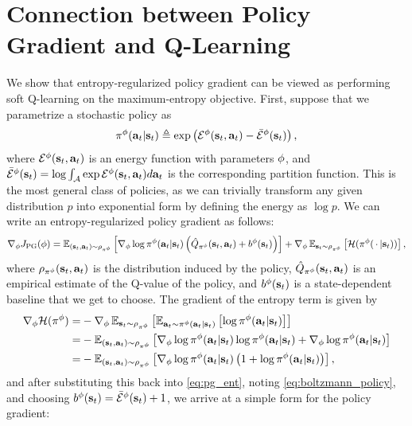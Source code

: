 \section{Connection between Policy Gradient and Q-Learning}
\label{app:pg}
We show that entropy-regularized policy gradient can be viewed as performing soft Q-learning on the maximum-entropy objective. First, suppose that we parametrize a stochastic policy as
\begin{align}
\pi^\phi({\mathbf{a}_t}|{\mathbf{s}_t}) \triangleq \exp\left(\mathcal{E}^\phi({\mathbf{s}_t}, {\mathbf{a}_t}) - \bar{\mathcal{E}}^\phi({\mathbf{s}_t})\right),
\label{eq:boltzmann_policy}
\end{align}
where $\mathcal{E}^\phi({\mathbf{s}_t}, {\mathbf{a}_t})$ is an energy function with parameters $\phi$, and $\bar{\mathcal{E}}^\phi({\mathbf{s}_t}) =\log\int_{\mathcal{A}} \exp\mathcal{E}^\phi({\mathbf{s}_t}, {\mathbf{a}_t})d{\mathbf{a}_t}$ is the corresponding partition function. This is the most general class of policies, as we can trivially transform any given distribution $p$ into exponential form by defining the energy as $\log p$. We can write an entropy-regularized policy gradient as follows:
\begin{align}
\nabla_\phi J_\mathrm{PG}(\phi) =  \operatorname{\mathbb{E}}_{({\mathbf{s}_t}, {\mathbf{a}_t})\sim\rho_{\pi^\phi}}\left[\nabla_\phi\log\pi^\phi({\mathbf{a}_t}|{\mathbf{s}_t})\left(\hat{Q}_{\pi^\phi}({\mathbf{s}_t}, {\mathbf{a}_t})+ b^\phi({\mathbf{s}_t})\right)\right]   + \nabla_\phi\operatorname{\mathbb{E}}_{{\mathbf{s}_t}\sim\rho_{\pi^\phi}}\left[\mathcal{H}(\pi^\phi(\,\cdot\, | {\mathbf{s}_t}))\right],
\label{eq:pg_ent}
\end{align}
where $\rho_{\pi^\phi}({\mathbf{s}_t}, {\mathbf{a}_t})$ is the distribution induced by the policy, $\hat{Q}_{\pi^\phi}({\mathbf{s}_t}, {\mathbf{a}_t})$ is an empirical estimate of the Q-value of the policy, and $b^\phi({\mathbf{s}_t})$ is a state-dependent baseline that we get to choose. The gradient of the entropy term is given by
\begin{align}
\nabla_\phi \mathcal{H}(\pi^\phi) = &-\nabla_\phi\operatorname{\mathbb{E}}_{{\mathbf{s}_t}\sim\rho_{\pi^\phi}}\left[\operatorname{\mathbb{E}}_{{\mathbf{a}_t}\sim\pi^\phi({\mathbf{a}_t}|{\mathbf{s}_t})}\left[\log\pi^\phi({\mathbf{a}_t}|{\mathbf{s}_t})\right]\right]\notag\\
=&-\operatorname{\mathbb{E}}_{({\mathbf{s}_t}, {\mathbf{a}_t})\sim\rho_{\pi^\phi}}\left[\nabla_\phi\log\pi^\phi({\mathbf{a}_t}|{\mathbf{s}_t})\log\pi^\phi({\mathbf{a}_t}|{\mathbf{s}_t}) + \nabla_\phi\log\pi^\phi({\mathbf{a}_t}|{\mathbf{s}_t})\right]\notag\\
=&-\operatorname{\mathbb{E}}_{({\mathbf{s}_t},{\mathbf{a}_t})\sim\rho_{\pi^\phi}}\left[\nabla_\phi\log\pi^\phi({\mathbf{a}_t}|{\mathbf{s}_t})\left(1 + \log\pi^\phi({\mathbf{a}_t}|{\mathbf{s}_t})\right)\right],
\end{align}
and after substituting this back into \autoref{eq:pg_ent}, noting \autoref{eq:boltzmann_policy}, and choosing $b^\phi({\mathbf{s}_t}) = \bar{\mathcal{E}}^\phi({\mathbf{s}_t}) + 1$, we arrive at a simple form for the policy gradient:
